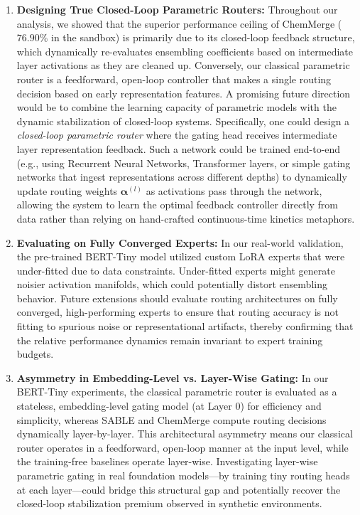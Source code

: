 \begin{enumerate}
    \item \textbf{Designing True Closed-Loop Parametric Routers:} Throughout our analysis, we showed that the superior performance ceiling of ChemMerge ($76.90\%$ in the sandbox) is primarily due to its closed-loop feedback structure, which dynamically re-evaluates ensembling coefficients based on intermediate layer activations as they are cleaned up. Conversely, our classical parametric router is a feedforward, open-loop controller that makes a single routing decision based on early representation features. A promising future direction would be to combine the learning capacity of parametric models with the dynamic stabilization of closed-loop systems. Specifically, one could design a \emph{closed-loop parametric router} where the gating head receives intermediate layer representation feedback. Such a network could be trained end-to-end (e.g., using Recurrent Neural Networks, Transformer layers, or simple gating networks that ingest representations across different depths) to dynamically update routing weights $\boldsymbol{\alpha}^{(l)}$ as activations pass through the network, allowing the system to learn the optimal feedback controller directly from data rather than relying on hand-crafted continuous-time kinetics metaphors.

    \item \textbf{Evaluating on Fully Converged Experts:} In our real-world validation, the pre-trained BERT-Tiny model utilized custom LoRA experts that were under-fitted due to data constraints. Under-fitted experts might generate noisier activation manifolds, which could potentially distort ensembling behavior. Future extensions should evaluate routing architectures on fully converged, high-performing experts to ensure that routing accuracy is not fitting to spurious noise or representational artifacts, thereby confirming that the relative performance dynamics remain invariant to expert training budgets.

    \item \textbf{Asymmetry in Embedding-Level vs. Layer-Wise Gating:} In our BERT-Tiny experiments, the classical parametric router is evaluated as a stateless, embedding-level gating model (at Layer 0) for efficiency and simplicity, whereas SABLE and ChemMerge compute routing decisions dynamically layer-by-layer. This architectural asymmetry means our classical router operates in a feedforward, open-loop manner at the input level, while the training-free baselines operate layer-wise. Investigating layer-wise parametric gating in real foundation models—by training tiny routing heads at each layer—could bridge this structural gap and potentially recover the closed-loop stabilization premium observed in synthetic environments.
\end{enumerate}

